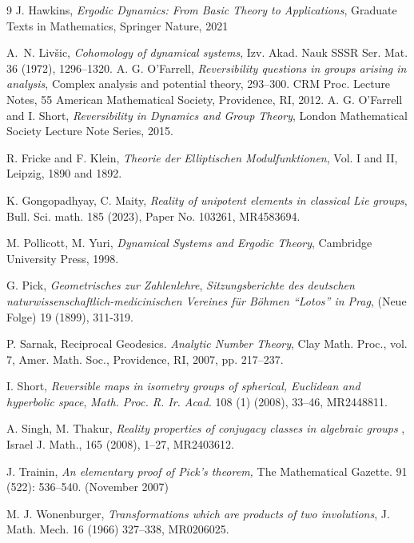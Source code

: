 \documentclass[12pt]{amsart}
\theoremstyle{plain}
\theoremstyle{definition}
\theoremstyle{remark}
\begin{document}
\begin{thebibliography}{9}
 J. Hawkins, \textit{Ergodic Dynamics: From Basic Theory to Applications}, Graduate Texts in Mathematics, Springer Nature, 2021

 A.~N. Livšic, {\em Cohomology of dynamical systems}, Izv. Akad. Nauk SSSR Ser. Mat. {36} (1972), 1296--1320. 
  	A. G. O’Farrell, {\em Reversibility questions in groups arising in analysis}, Complex analysis and potential theory, 293–300. CRM Proc. Lecture Notes, 55 American Mathematical Society, Providence, RI, 2012. 
 A. G. O'Farrell and I.   Short, {\em Reversibility in Dynamics and Group Theory},  London Mathematical Society Lecture Note Series, 2015.

  R. Fricke and F. Klein, {\it Theorie der Elliptischen Modulfunktionen}, Vol. I and II,
Leipzig, 1890 and 1892.


 K. Gongopadhyay, C. Maity,  {\em Reality of unipotent elements in classical Lie groups}, Bull. Sci. math. 185 (2023), Paper No.  103261, MR4583694.

        M. Pollicott, M. Yuri, \textit{Dynamical Systems and Ergodic Theory}, Cambridge University Press, 1998.

        G. Pick, \textit{Geometrisches zur Zahlenlehre}, {\em Sitzungsberichte des deutschen naturwissenschaftlich-medicinischen Vereines f\"ur B\"ohmen ``Lotos'' in Prag}, (Neue Folge) 19 (1899), 311-319.
  
 		P. Sarnak, Reciprocal Geodesics. \textit{Analytic Number Theory}, Clay Math. Proc., vol. 7, Amer. Math. Soc., Providence, RI, 2007, pp. 217–237. 

  I. Short, {\em Reversible maps in isometry groups of spherical, Euclidean and hyperbolic space}, {\it Math. Proc. R. Ir. Acad.} 108 (1) (2008), 33--46, MR2448811.

  A. Singh, M. Thakur, {\em Reality properties of conjugacy classes in algebraic groups} , Israel J. Math., 165 (2008), 1--27, MR2403612.

	
  J. Trainin, {\em  An elementary proof of Pick's theorem,} The Mathematical Gazette. 91 (522): 536–540. (November 2007)

 M.  J. Wonenburger, {\em Transformations which are products of two involutions}, J. Math. Mech.  16 (1966) 327--338, MR0206025.


  
	\end{thebibliography}
	
	
	
	
	
\end{document}
